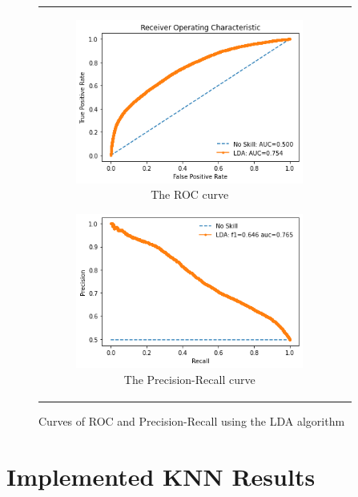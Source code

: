 \begin{figure}[H]
\begin{tabular}{@{}cc@{}}
\begin{subfigure}{0.5\textwidth}
  \centering
  \includegraphics[width=7.5cm]{fig/chapter5/LDA/ROC_new.png}
  \caption{\footnotesize{The \acrshort{ROC} curve}}
  \label{fig:ldaroc}
\end{subfigure} 
\begin{subfigure}{0.5\textwidth}
  \centering
  \includegraphics[width=7.5cm]{fig/chapter5/LDA/Precision-Recall_new.png}
  \caption{\footnotesize{The Precision-Recall curve}}
  \label{fig:ldaprerec}
\end{subfigure} \\
\end{tabular}
\caption{Curves of \acrshort{ROC} and Precision-Recall using the \acrshort{LDA} algorithm}
\label{fig:ldacurves}
\end{figure}

\section{Implemented KNN Results}

